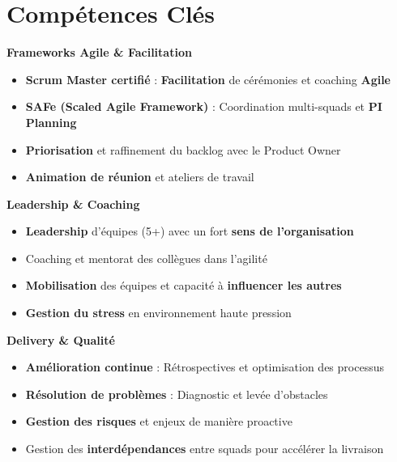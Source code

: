 \documentclass[11pt,a4paper]{article}
\newcommand{\highlight}[1]{\textcolor{primaryblue}{\textbf{#1}}}
\newcommand{\skilltitle}[1]{\normalsize\textcolor{primaryblue}{\textbf{#1}}}
\begin{document}
\section*{Compétences Clés}

\begin{minipage}[t]{0.55\textwidth}
\skilltitle{Frameworks Agile \& Facilitation}
\begin{itemize}[leftmargin=10pt]
    \item \highlight{Scrum Master certifié} : \highlight{Facilitation} de cérémonies et coaching \highlight{Agile}
    \item \highlight{SAFe (Scaled Agile Framework)} : Coordination multi-squads et \highlight{PI Planning}
    \item \highlight{Priorisation} et raffinement du backlog avec le Product Owner
    \item \highlight{Animation de réunion} et ateliers de travail
\end{itemize}

\skilltitle{Leadership \& Coaching}
\begin{itemize}[leftmargin=10pt]
    \item \highlight{Leadership} d'équipes (5+) avec un fort \highlight{sens de l'organisation}
    \item Coaching et mentorat des collègues dans l'agilité
    \item \highlight{Mobilisation} des équipes et capacité à \highlight{influencer les autres}
    \item \highlight{Gestion du stress} en environnement haute pression
\end{itemize}

\skilltitle{Delivery \& Qualité}
\begin{itemize}[leftmargin=10pt]
    \item \highlight{Amélioration continue} : Rétrospectives et optimisation des processus
    \item \highlight{Résolution de problèmes} : Diagnostic et levée d'obstacles
    \item \highlight{Gestion des risques} et enjeux de manière proactive
    \item Gestion des \highlight{interdépendances} entre squads pour accélérer la livraison
\end{itemize}
\end{minipage}
\hfill
\end{document}
